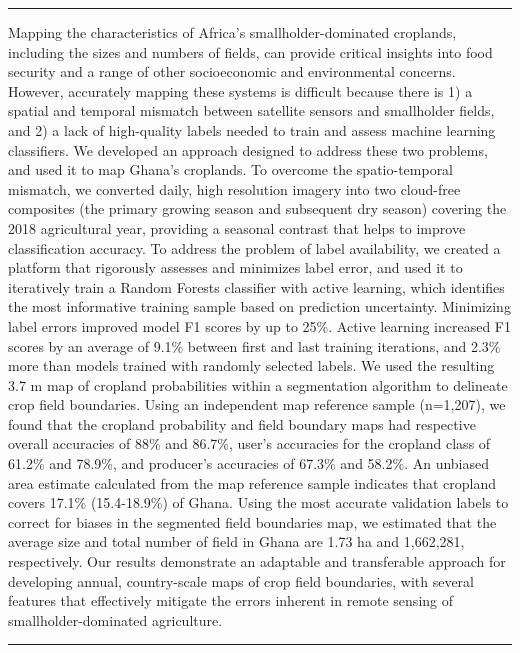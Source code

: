 \documentclass[11pt,a4paper]{article}
\renewenvironment{abstract}{
  \hfill\begin{minipage}{1\textwidth}
  \rule{\textwidth}{1pt}\vspace{5pt}
  \normalsize
  \begin{justify}
  \bfseries\abstractname\vspace{5pt}
  \end{justify}}
  {\par\noindent\rule{\textwidth}{1pt}\end{minipage}
}
\begin{document}
\begin{singlespace}
\begin{abstract}
Mapping the characteristics of Africa's smallholder-dominated croplands,
including the sizes and numbers of fields, can provide critical insights
into food security and a range of other socioeconomic and environmental
concerns. However, accurately mapping these systems is difficult because
there is 1) a spatial and temporal mismatch between satellite sensors
and smallholder fields, and 2) a lack of high-quality labels needed to
train and assess machine learning classifiers. We developed an approach
designed to address these two problems, and used it to map Ghana's
croplands. To overcome the spatio-temporal mismatch, we converted daily,
high resolution imagery into two cloud-free composites (the primary
growing season and subsequent dry season) covering the 2018 agricultural
year, providing a seasonal contrast that helps to improve classification
accuracy. To address the problem of label availability, we created a
platform that rigorously assesses and minimizes label error, and used it
to iteratively train a Random Forests classifier with active learning,
which identifies the most informative training sample based on
prediction uncertainty. Minimizing label errors improved model F1 scores
by up to 25\%. Active learning increased F1 scores by an average of
9.1\% between first and last training iterations, and 2.3\% more than
models trained with randomly selected labels. We used the resulting 3.7
m map of cropland probabilities within a segmentation algorithm to
delineate crop field boundaries. Using an independent map reference
sample (n=1,207), we found that the cropland probability and field
boundary maps had respective overall accuracies of 88\% and 86.7\%,
user's accuracies for the cropland class of 61.2\% and 78.9\%, and
producer's accuracies of 67.3\% and 58.2\%. An unbiased area estimate
calculated from the map reference sample indicates that cropland covers
17.1\% (15.4-18.9\%) of Ghana. Using the most accurate validation labels
to correct for biases in the segmented field boundaries map, we
estimated that the average size and total number of field in Ghana are
1.73 ha and 1,662,281, respectively. Our results demonstrate an
adaptable and transferable approach for developing annual, country-scale
maps of crop field boundaries, with several features that effectively
mitigate the errors inherent in remote sensing of smallholder-dominated
agriculture.
\end{abstract}
\end{singlespace}
\end{document}
